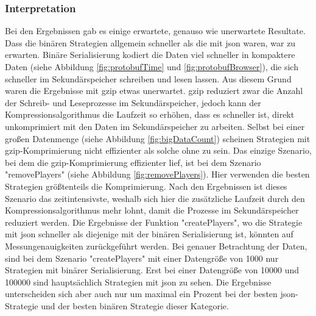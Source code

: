 \subsubsection{Interpretation}
Bei den Ergebnissen gab es einige erwartete, genauso wie unerwartete Resultate. Dass die binären Strategien allgemein schneller als die mit \ac{json} waren, war zu erwarten. Binäre Serialisierung kodiert die Daten viel schneller in kompaktere Daten (siehe Abbildung \ref{fig:protobufTime} und \ref{fig:protobufBrowser}), die sich schneller im Sekundärspeicher schreiben und lesen lassen. Aus diesem Grund waren die Ergebnisse mit \ac{gzip} etwas unerwartet. \ac{gzip} reduziert zwar die Anzahl der Schreib- und Leseprozesse im Sekundärspeicher, jedoch kann der Kompressionsalgorithmus die Laufzeit so erhöhen, dass es schneller ist, direkt unkomprimiert mit den Daten im Sekundärspeicher zu arbeiten. Selbst bei einer großen Datenmenge (siehe Abbildung \ref{fig:bigDataCount}) scheinen Strategien mit \ac{gzip}-Komprimierung nicht effizienter als solche ohne zu sein. Das einzige Szenario, bei dem die \ac{gzip}-Komprimierung effizienter lief, ist bei dem Szenario "removePlayers" (siehe Abbildung \ref{fig:removePlayers}). Hier verwenden die besten Strategien größtenteils die Komprimierung. Nach den Ergebnissen ist dieses Szenario das zeitintensivste, weshalb sich hier die zusätzliche Laufzeit durch den Kompressionsalgorithmus mehr lohnt, damit die Prozesse im Sekundärspeicher reduziert werden. Die Ergebnisse der Funktion "createPlayers", wo die Strategie mit \ac{json} schneller als diejenige mit der binären Serialisierung ist, könnten auf Messungenauigkeiten zurückgeführt werden. Bei genauer Betrachtung der Daten, sind bei dem Szenario "createPlayers" mit einer Datengröße von 1000 nur Strategien mit binärer Serialisierung. Erst bei einer Datengröße von 10000 und 100000 sind hauptsächlich Strategien mit \ac{json} zu sehen. Die Ergebnisse unterscheiden sich aber auch nur um maximal ein Prozent bei der besten \ac{json}-Strategie und der besten binären Strategie dieser Kategorie.

